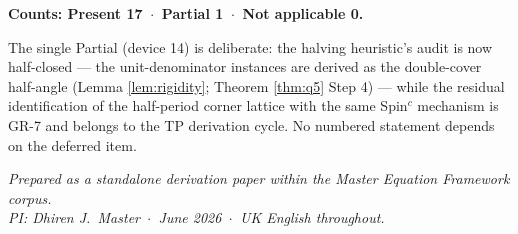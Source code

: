 \documentclass[11pt,a4paper]{article}
\theoremstyle{plain}
\theoremstyle{definition}
\theoremstyle{remark}
\begin{document}
\noindent\textbf{Counts: Present 17 \,$\cdot$\, Partial 1 \,$\cdot$\, Not applicable 0.}

\smallskip
\noindent The single Partial (device 14) is deliberate: the halving heuristic's audit is now half-closed --- the unit-denominator instances are derived as the double-cover half-angle (Lemma \ref{lem:rigidity}; Theorem \ref{thm:q5} Step 4) --- while the residual identification of the half-period corner lattice with the same Spin$^c$ mechanism is GR-7 and belongs to the TP derivation cycle. No numbered statement depends on the deferred item.

\bigskip
\begin{center}
\small\itshape Prepared as a standalone derivation paper within the Master Equation Framework corpus.\\
PI: Dhiren J.~Master \,$\cdot$\, June 2026 \,$\cdot$\, UK English throughout.
\end{center}
\end{document}
